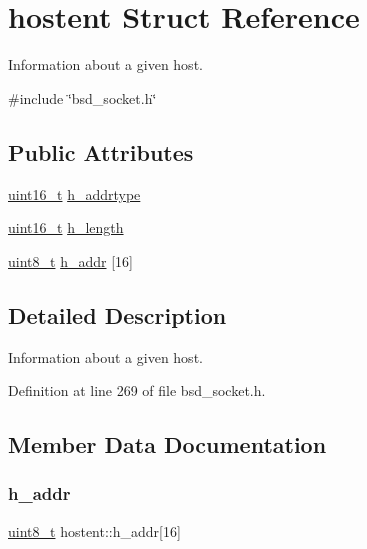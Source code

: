 \hypertarget{structhostent}{}\section{hostent Struct Reference}
\label{structhostent}


Information about a given host.  




{\ttfamily \#include \char`\"{}bsd\+\_\+socket.\+h\char`\"{}}

\subsection*{Public Attributes}
\begin{DoxyCompactItemize}
\item 
\hyperlink{stdint_8h_a273cf69d639a59973b6019625df33e30}{uint16\+\_\+t} \hyperlink{structhostent_ac50b1b1166869d7d33fb283bc0cc366e}{h\+\_\+addrtype}
\item 
\hyperlink{stdint_8h_a273cf69d639a59973b6019625df33e30}{uint16\+\_\+t} \hyperlink{structhostent_a541d2f4b6fc636f6afe7373229dfc541}{h\+\_\+length}
\item 
\hyperlink{stdint_8h_aba7bc1797add20fe3efdf37ced1182c5}{uint8\+\_\+t} \hyperlink{structhostent_acdf4c8e23515ea705f732efa3e096783}{h\+\_\+addr} \mbox{[}16\mbox{]}
\end{DoxyCompactItemize}


\subsection{Detailed Description}
Information about a given host. 

Definition at line 269 of file bsd\+\_\+socket.\+h.



\subsection{Member Data Documentation}
\mbox{\label{structhostent_acdf4c8e23515ea705f732efa3e096783}} 
\subsubsection{\texorpdfstring{h\+\_\+addr}{h\_addr}}
{\footnotesize\ttfamily \hyperlink{stdint_8h_aba7bc1797add20fe3efdf37ced1182c5}{uint8\+\_\+t} hostent\+::h\+\_\+addr\mbox{[}16\mbox{]}}



